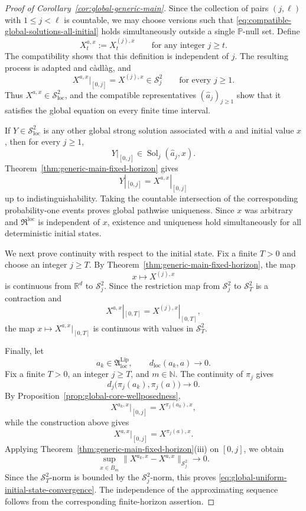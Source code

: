 \documentclass[12pt,oneside, reqno]{amsart}
\numberwithin{equation}{section}
\begin{document}
\begin{proof}[Proof of Corollary~\ref{cor:global-generic-main}]
		Since the collection of pairs $(j,\ell)$ with $1\leq j<\ell$ is
		countable, we may choose versions such that
		\eqref{eq:compatible-global-solutions-all-initial} holds
		simultaneously outside a single $\mathbb P$-null set. Define
		\[
		X_t^{a,x}:=X_t^{(j),x}
		\qquad
		\text{for any integer }j\geq t.
		\]
		The compatibility shows that this definition is independent of $j$.
		The resulting process is adapted and c\`adl\`ag, and
		\[
		X^{a,x}|_{[0,j]}=X^{(j),x}\in\mathcal S_j^2
		\qquad
		\text{for every }j\geq1.
		\]
		Thus $X^{a,x}\in\mathcal S_{\mathrm{loc}}^2$, and the compatible
		representatives $(\widehat a_j)_{j\geq1}$ show that it satisfies the
		global equation on every finite time interval.
		
		If $Y\in\mathcal S_{\mathrm{loc}}^2$ is any other global strong
		solution associated with $a$ and initial value $x$, then for every
		$j\geq1$,
		\[
		Y|_{[0,j]}\in\operatorname{Sol}_j(\widehat a_j,x).
		\]
		Theorem~\ref{thm:generic-main-fixed-horizon} gives
		\[
		Y|_{[0,j]}=X^{a,x}|_{[0,j]}
		\]
		up to indistinguishability. Taking the countable intersection of
		the corresponding probability-one events proves global pathwise
		uniqueness. Since $x$ was arbitrary and
		$\mathfrak R^{\mathrm{loc}}$ is independent of $x$, existence and
		uniqueness hold simultaneously for all deterministic initial states.
		
		We next prove continuity with respect to the initial state. Fix a
		finite $T>0$ and choose an integer $j\geq T$. By
		Theorem~\ref{thm:generic-main-fixed-horizon}, the map
		\[
		x\longmapsto X^{(j),x}
		\]
		is continuous from $\mathbb R^d$ to $\mathcal S_j^2$. Since the
		restriction map from $\mathcal S_j^2$ to $\mathcal S_T^2$ is a
		contraction and
		\[
		X^{a,x}|_{[0,T]}=X^{(j),x}|_{[0,T]},
		\]
		the map $x\mapsto X^{a,x}|_{[0,T]}$ is continuous with values in
		$\mathcal S_T^2$.
		
		Finally, let
		\[
		a_k\in\mathfrak A_{\mathrm{loc}}^{\mathrm{Lip}},
		\qquad
		d_{\mathrm{loc}}(a_k,a)\longrightarrow0.
		\]
		Fix a finite $T>0$, an integer $j\geq T$, and $m\in\mathbb N$.
		The continuity of $\pi_j$ gives
		\[
		d_j\bigl(\pi_j(a_k),\pi_j(a)\bigr)\longrightarrow0.
		\]
		By Proposition~\ref{prop:global-core-wellposedness},
		\[
		X^{a_k,x}|_{[0,j]}=X^{\pi_j(a_k),x},
		\]
		while the construction above gives
		\[
		X^{a,x}|_{[0,j]}=X^{\pi_j(a),x}.
		\]
		Applying
		Theorem~\ref{thm:generic-main-fixed-horizon}\textnormal{(iii)} on
		$[0,j]$, we obtain
		\[
		\sup_{x\in\overline B_m}
		\|X^{a_k,x}-X^{a,x}\|_{\mathcal S_j^2}
		\longrightarrow0.
		\]
		Since the $\mathcal S_T^2$-norm is bounded by the
		$\mathcal S_j^2$-norm, this proves
		\eqref{eq:global-uniform-initial-state-convergence}. The independence
		of the approximating sequence follows from the corresponding
		finite-horizon assertion.
	\end{proof}
	
\end{document}
